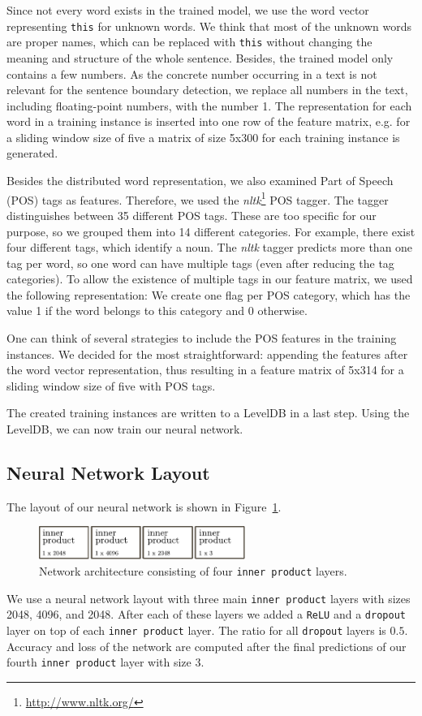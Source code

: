 Since not every word exists in the trained model, we use the word vector representing \texttt{this} for unknown words.
We think that most of the unknown words are proper names, which can be replaced with \texttt{this} without changing the meaning and structure of the whole sentence.
Besides, the trained model only contains a few numbers.
As the concrete number occurring in a text is not relevant for the sentence boundary detection, we replace all numbers in the text, including floating-point numbers, with the number 1.
The representation for each word in a training instance is inserted into one row of the feature matrix, e.g. for a sliding window size of five a matrix of size 5x300 for each training instance is generated.

Besides the distributed word representation, we also examined Part of Speech (POS) tags as features.
Therefore, we used the \emph{nltk}\footnote{\url{http://www.nltk.org/}} POS tagger.
The tagger distinguishes between 35 different POS tags.
These are too specific for our purpose, so we grouped them into 14 different categories.
For example, there exist four different tags, which identify a noun.
The \emph{nltk} tagger predicts more than one tag per word, so one word can have multiple tags (even after reducing the tag categories).
To allow the existence of multiple tags in our feature matrix, we used the following representation:
We create one flag per POS category, which has the value 1 if the word belongs to this category and 0 otherwise.

One can think of several strategies to include the POS features in the training instances.
We decided for the most straightforward: appending the features after the word vector representation, thus resulting in a feature matrix of 5x314 for a sliding window size of five with POS tags.

The created training instances are written to a LevelDB in a last step.
Using the LevelDB, we can now train our neural network.


\subsection{Neural Network Layout}

The layout of our neural network is shown in Figure~\ref{fig:net_lexical}.
\begin{figure}[ht]
    \centering
    \includegraphics[width=0.6\textwidth]{img/net_lexical.pdf}
    \caption{Network architecture consisting of four \texttt{inner product} layers.}
    \label{fig:net_lexical}
\end{figure}
We use a neural network layout with three main \texttt{inner product} layers with sizes 2048, 4096, and 2048.
After each of these layers we added a \texttt{ReLU} and a \texttt{dropout} layer on top of each \texttt{inner product} layer.
The ratio for all \texttt{dropout} layers is $0.5$.
Accuracy and loss of the network are computed after the final predictions of our fourth \texttt{inner product} layer with size 3.


